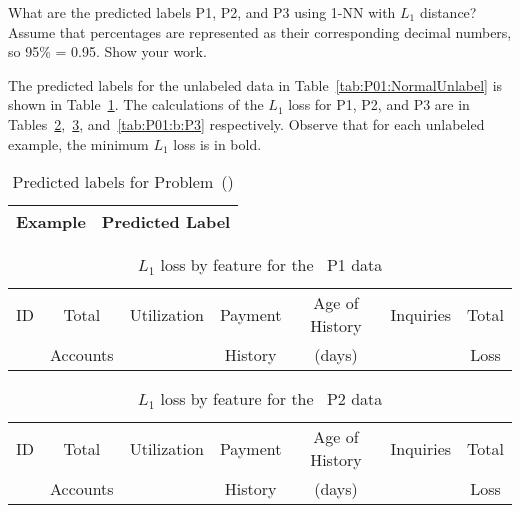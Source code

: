 \FloatBarrier
\begin{subproblem}
  What are the predicted labels P1, P2, and P3 using 1-NN with $L_1$ distance? Assume that percentages are represented as their corresponding decimal numbers, so 95\% = 0.95. Show your work.
\end{subproblem}

The predicted labels for the unlabeled data in Table~\ref{tab:P01:NormalUnlabel} is shown in Table~\ref{tab:P01:b:PredictedLabels}.  The calculations of the $L_1$ loss for P1, P2, and P3 are in Tables~\ref{tab:P01:b:P1},~\ref{tab:P01:b:P2}, and~\ref{tab:P01:b:P3} respectively.  Observe that for each unlabeled example, the minimum $L_1$ loss is in bold.

\begin{table}[h]
  \centering
  \caption{Predicted labels for Problem~()}\label{tab:P01:b:PredictedLabels}
  \begin{tabular}{|c|c|}
    \hline
    Example & Predicted Label \\\hline\hline
    
  \end{tabular}
\end{table}

\begin{table}[h]
  \centering
  \caption{$L_1$ loss by feature for the \featureOp\ P1 data}\label{tab:P01:b:P1}
  \begin{tabular}{|c||c|c|c|c|c||c|}
    \hline
    ID & Total    & Utilization & Payment & Age of History & Inquiries & Total \\
       & Accounts &             & History & (days)         &           & Loss \\\hline\hline
    
  \end{tabular}
\end{table}

\begin{table}[h]
  \centering
  \caption{$L_1$ loss by feature for the \featureOp\ P2 data}\label{tab:P01:b:P2}
  \begin{tabular}{|c||c|c|c|c|c||c|}
    \hline
    ID & Total    & Utilization & Payment & Age of History & Inquiries & Total \\
       & Accounts &             & History & (days)         &           & Loss \\\hline\hline
    
  \end{tabular}
\end{table}

